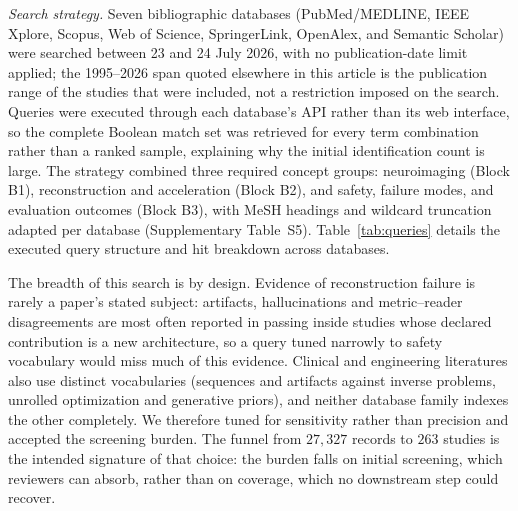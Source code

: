 \documentclass[review,authoryear]{elsarticle}
\begin{document}
\emph{Search strategy.} Seven bibliographic databases (PubMed/MEDLINE, IEEE Xplore,
Scopus, Web of Science, SpringerLink, OpenAlex, and Semantic Scholar) were searched
between 23 and 24 July 2026, with no publication-date limit applied; the 1995--2026 span
quoted elsewhere in this article is the publication range of the studies that were
included, not a restriction imposed on the search. Queries were
executed through each database's API rather than its web interface, so the complete
Boolean match set was retrieved for every term combination rather than a ranked sample,
explaining why the initial identification count is large. The strategy combined three required
concept groups: neuroimaging (Block B1), reconstruction and acceleration (Block B2), and
safety, failure modes, and evaluation outcomes (Block B3), with MeSH headings and wildcard
truncation adapted per database (Supplementary Table~S5). Table~\ref{tab:queries} details the executed query structure and hit breakdown across databases.

The breadth of this search is by design. Evidence of reconstruction failure is rarely a
paper's stated subject: artifacts, hallucinations and metric--reader disagreements are most
often reported in passing inside studies whose declared contribution is a new architecture,
so a query tuned narrowly to safety vocabulary would miss much of this evidence. Clinical
and engineering literatures also use distinct vocabularies (sequences and artifacts
against inverse problems, unrolled optimization and generative priors), and neither
database family indexes the other completely. We therefore tuned for sensitivity rather
than precision and accepted the screening burden. The funnel from $27{,}327$ records to
$263$ studies is the intended signature of that choice: the burden falls on initial
screening, which reviewers can absorb, rather than on coverage, which no downstream step
could recover.
\end{document}
